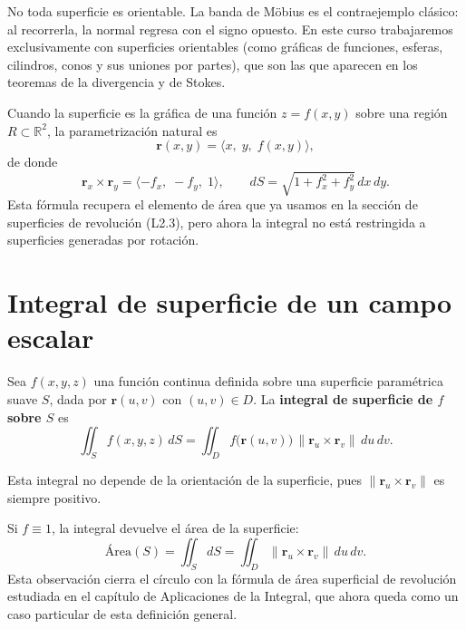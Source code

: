 \begin{rem}
No toda superficie es orientable. La banda de Möbius es el contraejemplo clásico: al recorrerla, la normal regresa con el signo opuesto. En este curso trabajaremos exclusivamente con superficies orientables (como gráficas de funciones, esferas, cilindros, conos y sus uniones por partes), que son las que aparecen en los teoremas de la divergencia y de Stokes.
\end{rem}

Cuando la superficie es la gráfica de una función $z = f(x,y)$ sobre una región $R\subset\mathbb{R}^2$, la parametrización natural es
\[
\mathbf{r}(x,y) = \langle x,\; y,\; f(x,y) \rangle,
\]
de donde
\[
\mathbf{r}_x \times \mathbf{r}_y = \langle -f_x,\; -f_y,\; 1 \rangle,
\qquad
dS = \sqrt{1+f_x^2+f_y^2}\,dx\,dy.
\]
Esta fórmula recupera el elemento de área que ya usamos en la sección de superficies de revolución (L2.3), pero ahora la integral no está restringida a superficies generadas por rotación.

\section{Integral de superficie de un campo escalar}

\begin{definition}
Sea $f(x,y,z)$ una función continua definida sobre una superficie paramétrica suave $S$, dada por $\mathbf{r}(u,v)$ con $(u,v)\in D$. La \textbf{integral de superficie de $f$ sobre $S$} es
\[
\iint_S f(x,y,z)\,dS
=
\iint_D f\bigl(\mathbf{r}(u,v)\bigr)\,\|\mathbf{r}_u \times \mathbf{r}_v\|\,du\,dv.
\]
\end{definition}

Esta integral no depende de la orientación de la superficie, pues $\| \mathbf{r}_u \times \mathbf{r}_v \|$ es siempre positivo.

\begin{rem}
Si $f\equiv 1$, la integral devuelve el área de la superficie:
\[
\text{Área}(S) = \iint_S dS = \iint_D \|\mathbf{r}_u \times \mathbf{r}_v\|\,du\,dv.
\]
Esta observación cierra el círculo con la fórmula de área superficial de revolución estudiada en el capítulo de Aplicaciones de la Integral, que ahora queda como un caso particular de esta definición general.
\end{rem}

